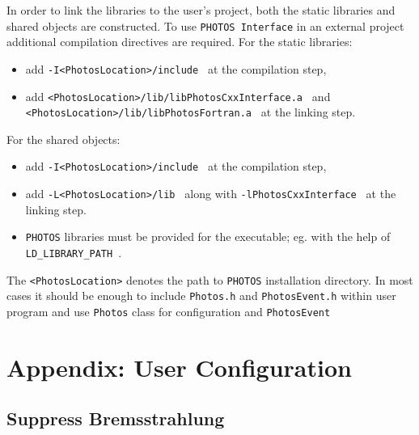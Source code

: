 \documentclass[]{Photos_interface_design}
\begin{document}
In order to link the libraries to the user's project, both the static libraries and shared objects are
constructed. To use {\tt PHOTOS Interface} in an external project additional 
compilation directives are required. For the static libraries:
\begin{itemize}
  \item add {\tt -I<PhotosLocation>/include } at the compilation step,
  \item add {\tt <PhotosLocation>/lib/libPhotosCxxInterface.a } and\\
        {\tt <PhotosLocation>/lib/libPhotosFortran.a } at the linking step.
\end{itemize}
For the shared objects:
\begin{itemize}
  \item add {\tt -I<PhotosLocation>/include } at the compilation step,
  \item add {\tt -L<PhotosLocation>/lib } along with {\tt -lPhotosCxxInterface } at the linking step.
  \item  {\tt PHOTOS} libraries must be provided for the executable; eg. with the help of  {\tt LD\_LIBRARY\_PATH }.
\end{itemize}
The {\tt <PhotosLocation>} denotes the  path to {\tt PHOTOS} installation directory.
In most cases it should be enough to include {\tt Photos.h} and {\tt PhotosEvent.h}
within user program and use {\tt Photos} class for configuration and {\tt PhotosEvent}

\section{Appendix: User Configuration}
\label{sec:User Configuration}

\subsection{Suppress Bremsstrahlung}
\label{section:suppress}
\end{document}
